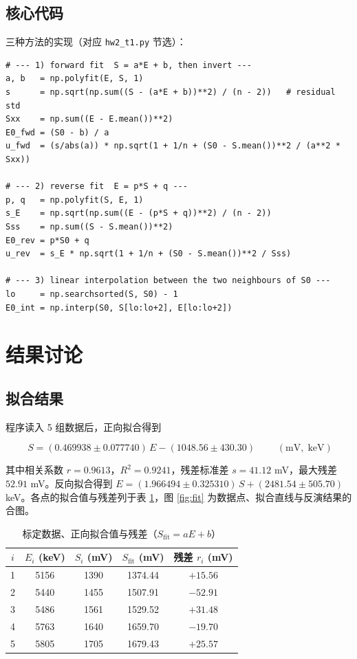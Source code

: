 \documentclass[UTF8,a4paper,12pt]{ctexart}
\begin{document}
\subsection{核心代码}

三种方法的实现（对应 \texttt{hw2\_t1.py} 节选）：

\begin{lstlisting}[caption={三种计算方法（hw2\_t1.py 节选）}]
# --- 1) forward fit  S = a*E + b, then invert ---
a, b   = np.polyfit(E, S, 1)
s      = np.sqrt(np.sum((S - (a*E + b))**2) / (n - 2))   # residual std
Sxx    = np.sum((E - E.mean())**2)
E0_fwd = (S0 - b) / a
u_fwd  = (s/abs(a)) * np.sqrt(1 + 1/n + (S0 - S.mean())**2 / (a**2 * Sxx))

# --- 2) reverse fit  E = p*S + q ---
p, q   = np.polyfit(S, E, 1)
s_E    = np.sqrt(np.sum((E - (p*S + q))**2) / (n - 2))
Sss    = np.sum((S - S.mean())**2)
E0_rev = p*S0 + q
u_rev  = s_E * np.sqrt(1 + 1/n + (S0 - S.mean())**2 / Sss)

# --- 3) linear interpolation between the two neighbours of S0 ---
lo     = np.searchsorted(S, S0) - 1
E0_int = np.interp(S0, S[lo:lo+2], E[lo:lo+2])
\end{lstlisting}

\section{结果讨论}

\subsection{拟合结果}

程序读入 5 组数据后，正向拟合得到

\begin{equation}
  \boxed{\;S=(0.469938\pm0.077740)\,E-(1048.56\pm430.30)\;}
\qquad(\text{mV},\;\text{keV})
\end{equation}

其中相关系数 $r=0.9613$，$R^2=0.9241$，残差标准差 $s=41.12$ mV，最大残差 $52.91$ mV。反向拟合得到 $E=(1.966494\pm0.325310)\,S+(2481.54\pm505.70)$ keV。各点的拟合值与残差列于表 \ref{tab:points}，图 \ref{fig:fit} 为数据点、拟合直线与反演结果的合图。

\begin{table}[H]
  \centering
  \caption{标定数据、正向拟合值与残差（$S_{\text{fit}}=aE+b$）}
  \label{tab:points}
  \begin{tabular}{|c|c|c|c|c|}
    \hline
    $i$ & $E_i$ (keV) & $S_i$ (mV) & $S_{\text{fit}}$ (mV) & 残差 $r_i$ (mV) \\
    \hline
    1 & 5156 & 1390 & 1374.44 & $+15.56$ \\
    \hline
    2 & 5440 & 1455 & 1507.91 & $-52.91$ \\
    \hline
    3 & 5486 & 1561 & 1529.52 & $+31.48$ \\
    \hline
    4 & 5763 & 1640 & 1659.70 & $-19.70$ \\
    \hline
    5 & 5805 & 1705 & 1679.43 & $+25.57$ \\
    \hline
  \end{tabular}
\end{table}
\end{document}
